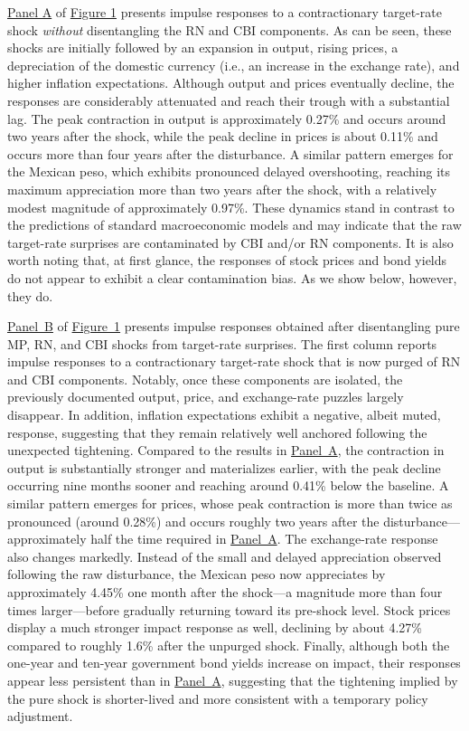 \documentclass[\latexroot/\projectname]{subfiles}
\begin{document}
\hyperlink{Panel BF1}{Panel A} of \hyperlink{Figure 1}{Figure 1} presents impulse responses to a contractionary target-rate shock \emph{without} disentangling the RN and CBI components.  As can be seen, these shocks are initially followed by an expansion in output, rising prices, a depreciation of the domestic currency (i.e., an increase in the exchange rate), and higher inflation expectations. Although output and prices eventually decline, the responses are considerably attenuated and reach their trough with a substantial lag. The peak contraction in output is approximately 0.27\% and occurs around two years after the shock, while the peak decline in prices is about 0.11\% and occurs more than four years after the disturbance. A similar pattern emerges for the Mexican peso, which exhibits pronounced delayed overshooting, reaching its maximum appreciation more than two years after the shock, with a relatively modest magnitude of approximately 0.97\%. These dynamics stand in contrast to the predictions of standard macroeconomic models and may indicate that the raw target-rate surprises are contaminated by CBI and/or RN components. It is also worth noting that, at first glance, the responses of stock prices and bond yields do not appear to exhibit a clear contamination bias. As we show below, however, they do.

\hyperlink{Panel BF1}{Panel~B} of \hyperlink{Figure~1}{Figure~1} presents impulse responses obtained after disentangling pure MP, RN, and CBI shocks from target-rate surprises. The first column reports impulse responses to a contractionary target-rate shock that is now purged of RN and CBI components. Notably, once these components are isolated, the previously documented output, price, and exchange-rate puzzles largely disappear. In addition, inflation expectations exhibit a negative, albeit muted, response, suggesting that they remain relatively well anchored following the unexpected tightening. Compared to the results in \hyperlink{Panel BF1}{Panel~A}, the contraction in output is substantially stronger and materializes earlier, with the peak decline occurring nine months sooner and reaching around 0.41\% below the baseline. A similar pattern emerges for prices, whose peak contraction is more than twice as pronounced (around 0.28\%) and occurs roughly two years after the disturbance—approximately half the time required in \hyperlink{Panel BF1}{Panel~A}. The exchange-rate response also changes markedly. Instead of the small and delayed appreciation observed following the raw disturbance, the Mexican peso now appreciates by approximately 4.45\% one month after the shock—a magnitude more than four times larger—before gradually returning toward its pre-shock level. Stock prices display a much stronger impact response as well, declining by about 4.27\% compared to roughly 1.6\% after the unpurged shock. Finally, although both the one-year and ten-year government bond yields increase on impact, their responses appear less persistent than in \hyperlink{Panel BF1}{Panel~A}, suggesting that the tightening implied by the pure shock is shorter-lived and more consistent with a temporary policy adjustment.
\end{document}
